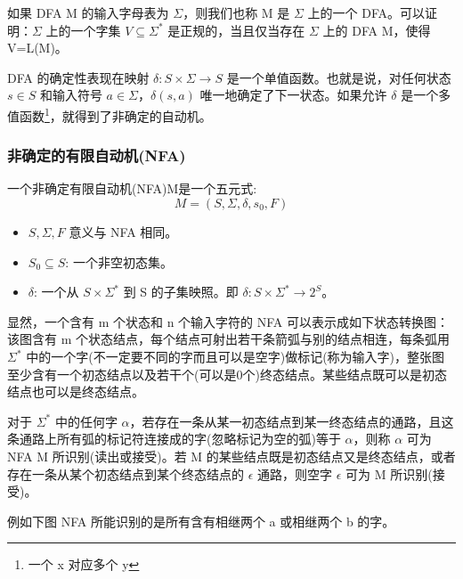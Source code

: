 如果 DFA M 的输入字母表为 $\Sigma$，则我们也称 M 是 $\Sigma$ 上的一个 DFA。可以证明：$\Sigma$ 上的一个字集 $V \subseteq \Sigma^*$ 是正规的，当且仅当存在 $\Sigma$ 上的 DFA M，使得 V=L(M)。

DFA 的确定性表现在映射 $\delta:S\times \Sigma \rightarrow S$ 是一个单值函数。也就是说，对任何状态 $s\in S$ 和输入符号 $a\in \Sigma$，$\delta(s,a)$ 唯一地确定了下一状态。如果允许 $\delta$ 是一个多值函数\footnote{一个 x 对应多个 y}，就得到了非确定的自动机。

\subsubsection{非确定的有限自动机(NFA)}

一个非确定有限自动机(NFA)M是一个五元式:
\[ M = (S,\Sigma,\delta,s_0,F) \]

\begin{itemize}
    \item $S,\Sigma,F$ 意义与 NFA 相同。
    \item $S_0 \subseteq S$: 一个非空初态集。
    \item $\delta$: 一个从 $S \times \Sigma^*$ 到 S 的子集映照。即 $\delta:S\times \Sigma^* \rightarrow 2^S$。
\end{itemize}

显然，一个含有 m 个状态和 n 个输入字符的 NFA 可以表示成如下状态转换图：该图含有 m 个状态结点，每个结点可射出若干条箭弧与别的结点相连，每条弧用 $\Sigma^*$ 中的一个字(不一定要不同的字而且可以是空字)做标记(称为输入字)，整张图至少含有一个初态结点以及若干个(可以是0个)终态结点。某些结点既可以是初态结点也可以是终态结点。

对于 $\Sigma^*$ 中的任何字 $\alpha$，若存在一条从某一初态结点到某一终态结点的通路，且这条通路上所有弧的标记符连接成的字(忽略标记为空的弧)等于 $\alpha$，则称 $\alpha$ 可为 NFA M 所识别(读出或接受)。若 M 的某些结点既是初态结点又是终态结点，或者存在一条从某个初态结点到某个终态结点的 $\epsilon$ 通路，则空字 $\epsilon$ 可为 M 所识别(接受)。

例如下图 NFA 所能识别的是所有含有相继两个 a 或相继两个 b 的字。

